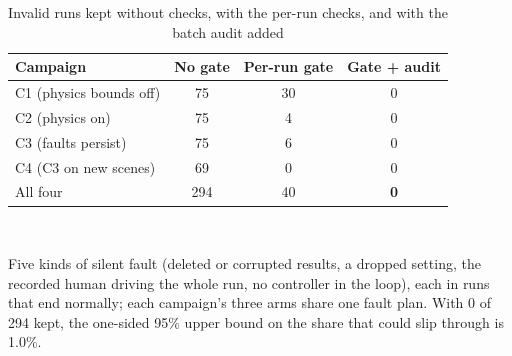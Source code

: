 \begin{table}[t]
\caption{Invalid runs kept without checks, with the per-run checks, and with the batch audit added}
\label{tab:validity}
\centering\footnotesize
\begin{tabular}{@{}lccc@{}}
\toprule
Campaign & No gate & Per-run gate & Gate + audit \\
\midrule
C1 (physics bounds off) & 75 & 30 & 0 \\
C2 (physics on) & 75 & 4 & 0 \\
C3 (faults persist) & 75 & 6 & 0 \\
C4 (C3 on new scenes) & 69 & 0 & 0 \\
\midrule
All four & 294 & 40 & \textbf{0} \\
\bottomrule
\end{tabular}
\\[2pt]\parbox{\columnwidth}{\scriptsize Five kinds of silent fault (deleted or corrupted results, a dropped setting, the recorded human driving the whole run, no controller in the loop), each in runs that end normally; each campaign's three arms share one fault plan. With 0 of 294 kept, the one-sided 95\% upper bound on the share that could slip through is 1.0\%.}
\end{table}

